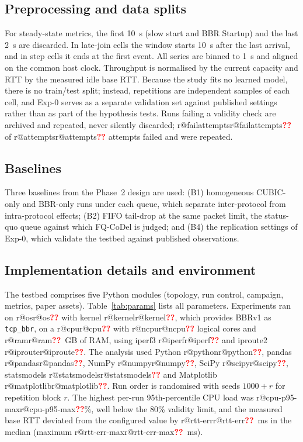 \documentclass[conference]{IEEEtran}
\makeatletter
\newcommand{\R}[1]{\ifcsname r@#1\endcsname\csname r@#1\endcsname\else\textcolor{red}{\textbf{??}}\fi}
\makeatother
\begin{document}
\subsection{Preprocessing and data splits}
For steady-state metrics, the first 10~s (slow start and BBR Startup) and the last 2~s are discarded. In late-join cells the window starts 10~s after the last arrival, and in step cells it ends at the first event. All series are binned to 1~s and aligned on the common host clock. Throughput is normalised by the current capacity and RTT by the measured idle base RTT. Because the study fits no learned model, there is no train/test split; instead, repetitions are independent samples of each cell, and Exp-0 serves as a separate validation set against published settings rather than as part of the hypothesis tests. Runs failing a validity check are archived and repeated, never silently discarded; \R{failattempts} of \R{attempts} attempts failed and were repeated.

\subsection{Baselines}
Three baselines from the Phase~2 design are used: (B1) homogeneous CUBIC-only and BBR-only runs under each queue, which separate inter-protocol from intra-protocol effects; (B2) FIFO tail-drop at the same packet limit, the status-quo queue against which FQ-CoDel is judged; and (B4) the replication settings of Exp-0, which validate the testbed against published observations.

\subsection{Implementation details and environment}
The testbed comprises five Python modules (topology, run control, campaign, metrics, paper assets). Table~\ref{tab:params} lists all parameters. Experiments ran on \R{os} with kernel \R{kernel}, which provides BBRv1 as \texttt{tcp\_bbr}, on a \R{cpu} with \R{ncpu} logical cores and \R{ram}~GB of RAM, using iperf3 \R{iperf} and iproute2 \R{iproute}. The analysis used Python \R{python}, pandas \R{pandas}, NumPy \R{numpy}, SciPy \R{scipy}, statsmodels \R{statsmodels} and Matplotlib \R{matplotlib}. Run order is randomised with seeds $1000+r$ for repetition block $r$. The highest per-run 95th-percentile CPU load was \R{cpu-p95-max}\%, well below the 80\% validity limit, and the measured base RTT deviated from the configured value by \R{rtt-err}~ms in the median (maximum \R{rtt-err-max}~ms).
\end{document}

